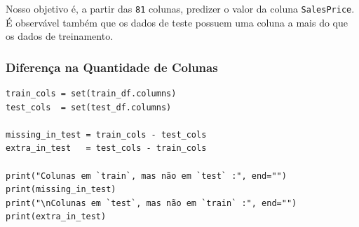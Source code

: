 \documentclass[11pt]{article}
\begin{document}
Nosso objetivo é, a partir das \texttt{81}  colunas, predizer o valor da coluna \texttt{SalesPrice}. É observável também que os dados de teste possuem uma coluna a mais do que os dados de treinamento.
\subsubsection{Diferença na Quantidade de Colunas}
\label{sec:org94c0d02}
\begin{verbatim}
train_cols = set(train_df.columns)
test_cols  = set(test_df.columns)

missing_in_test = train_cols - test_cols
extra_in_test   = test_cols - train_cols

print("Colunas em `train`, mas não em `test` :", end="")
print(missing_in_test)
print("\nColunas em `test`, mas não em `train` :", end="")
print(extra_in_test)
\end{verbatim}
\end{document}
